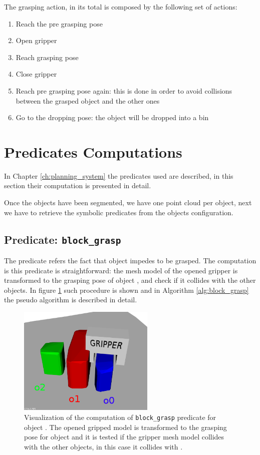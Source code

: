 The grasping action, in its total is composed by the following set of actions: 
\begin{enumerate}
\item Reach the pre grasping pose
\item Open gripper
\item Reach grasping pose
\item Close gripper
\item Reach pre grasping pose again: this is done in order to avoid collisions between the grasped object and the other ones
\item Go to the dropping pose: the object will be dropped into a bin
\end{enumerate}

\section{Predicates Computations}
In Chapter \ref{ch:planning_system}  the predicates used are described, in this section their computation is presented in detail. 

Once the objects have been segmented, we have one point cloud per object, next we have to retrieve the symbolic predicates from the objects configuration. 

\subsection{Predicate: \texttt{block\_grasp}}
The  predicate refers the fact that object  impedes  to be grasped. The computation is this predicate is straightforward: the mesh model of the opened gripper is transformed to the grasping pose of object , and check if it collides with the other objects. In figure \ref{fig:block_grasp} such procedure is shown and in Algorithm \ref{alg:block_grasp} the pseudo algorithm is described in detail. 

\begin{figure}[h]
\centering
\includegraphics[width=6.5cm]{Img/grasping/block_grasp.png}
\caption{Visualization of the computation of \texttt{block\_grasp} predicate for object . The opened gripped model is transformed to the grasping pose for object  and it is tested if the gripper mesh model collides with the other objects, in this case it collides with . }\label{fig:block_grasp}
\end{figure}

